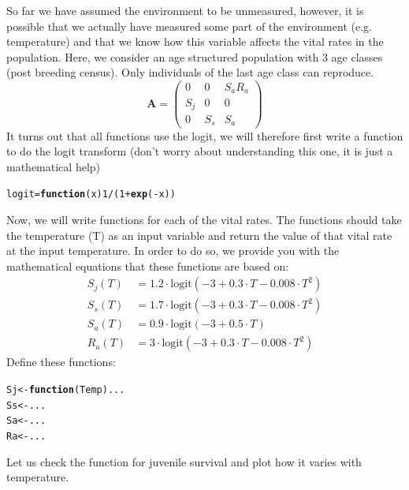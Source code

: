\documentclass{article}\usepackage[]{graphicx}\usepackage[]{color}
\makeatletter
\newcommand{\hlnum}[1]{\textcolor[rgb]{0.686,0.059,0.569}{#1}}%
\newcommand{\hlopt}[1]{\textcolor[rgb]{0,0,0}{#1}}%
\newcommand{\hlstd}[1]{\textcolor[rgb]{0.345,0.345,0.345}{#1}}%
\newcommand{\hlkwa}[1]{\textcolor[rgb]{0.161,0.373,0.58}{\textbf{#1}}}%
\newcommand{\hlkwb}[1]{\textcolor[rgb]{0.69,0.353,0.396}{#1}}%
\newcommand{\hlkwc}[1]{\textcolor[rgb]{0.333,0.667,0.333}{#1}}%
\newcommand{\hlkwd}[1]{\textcolor[rgb]{0.737,0.353,0.396}{\textbf{#1}}}%
\newenvironment{kframe}{%
 \def\at@end@of@kframe{}%
 \ifinner\ifhmode%
  \def\at@end@of@kframe{\end{minipage}}%
  \begin{minipage}{\columnwidth}%
 \fi\fi%
 \def\FrameCommand##1{\hskip\@totalleftmargin \hskip-\fboxsep
 \colorbox{shadecolor}{##1}\hskip-\fboxsep
     \hskip-\linewidth \hskip-\@totalleftmargin \hskip\columnwidth}%
 \MakeFramed {\advance\hsize-\width
   \@totalleftmargin\z@ \linewidth\hsize
   \@setminipage}}%
 {\par\unskip\endMakeFramed%
 \at@end@of@kframe}
\newenvironment{knitrout}{}{} %
\makeatother
\begin{document}
So far we have assumed the environment to be unmeasured, however, it is possible that we actually have measured some part of the environment (e.g. temperature) and that we know how this variable affects the vital rates in the population. Here, we consider an age structured population with 3 age classes (post breeding census). Only individuals of the last age class can reproduce.
\begin{equation*}
\boldsymbol{A} = \begin{pmatrix} 0 & 0 & S_a R_a \\
S_j & 0 & 0 \\
0 & S_s & S_a\end{pmatrix}
\end{equation*}
It turns out that all functions use the logit, we will therefore first write a function to do the logit transform (don't worry about understanding this one, it is just a mathematical help)
\begin{knitrout}
\color{fgcolor}\begin{kframe}
\begin{alltt}
\hlstd{logit}\hlkwb{=}\hlkwa{function}\hlstd{(}\hlkwc{x}\hlstd{)} \hlnum{1}\hlopt{/}\hlstd{(}\hlnum{1}\hlopt{+}\hlkwd{exp}\hlstd{(}\hlopt{-}\hlstd{x))}
\end{alltt}
\end{kframe}
\end{knitrout}
Now, we will write functions for each of the vital rates. The functions should take the temperature (T) as an input variable and return the value of that vital rate at the input temperature. In order to do so, we provide you with the mathematical equations that these functions are based on:
\begin{align*}
S_j (T) & = 1.2\cdot \text{logit}(-3 + 0.3\cdot T - 0.008\cdot T^2)\\
S_s (T) & = 1.7\cdot \text{logit}(-3 + 0.3\cdot T - 0.008\cdot T^2)\\
S_a (T) & = 0.9\cdot \text{logit}(-3 + 0.5\cdot T)\\
R_a(T) & = 3\cdot \text{logit}(-3 + 0.3\cdot T - 0.008\cdot T^2)
\end{align*}
Define these functions:
\begin{knitrout}
\color{fgcolor}\begin{kframe}
\begin{alltt}
\hlstd{Sj} \hlkwb{<-} \hlkwa{function}\hlstd{(}\hlkwc{Temp}\hlstd{) ...}
\hlstd{Ss} \hlkwb{<-} \hlstd{...}
\hlstd{Sa} \hlkwb{<-} \hlstd{...}
\hlstd{Ra} \hlkwb{<-} \hlstd{...}
\end{alltt}
\end{kframe}
\end{knitrout}
Let us check the function for juvenile survival and plot how it varies with temperature.
\end{document}
